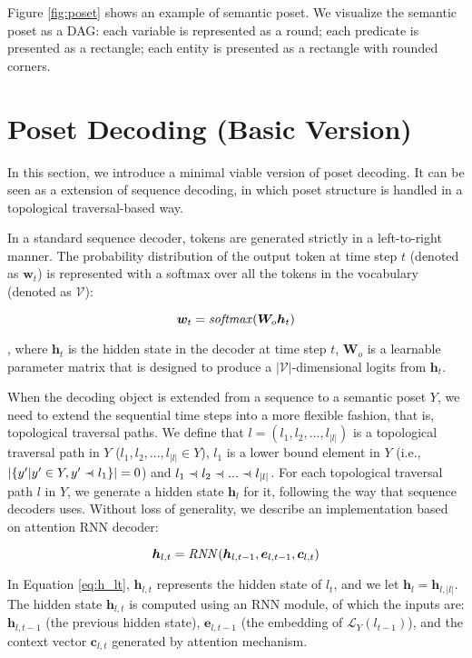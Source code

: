 \documentclass{article}
\newcommand{\precdot}{\prec\mathrel{\mkern-5mu}\mathrel{\cdot}}
\begin{document}
Figure \ref{fig:poset} shows an example of semantic poset.
We visualize the semantic poset as a DAG:
each variable is represented as a round;
each predicate is presented as a rectangle;
each entity is presented as a rectangle with rounded corners.

\section{Poset Decoding (Basic Version)}
\label{section:base}

In this section, we introduce a minimal viable version of poset decoding. It can be seen as a extension of sequence decoding, in which poset structure is handled in a topological traversal-based way.

In a standard sequence decoder, tokens are generated strictly in a left-to-right manner.
The probability distribution of the output token at time step $t$ (denoted as $\bm{w}_t$) is represented with a softmax over all the tokens in the vocabulary (denoted as $\mathcal{V}$):

\begin{equation}
\bm{w}_t = \text{\emph{softmax}}(\bm{W}_o\bm{h}_t)
\end{equation}

, where $\bm{h}_t$ is the hidden state in the decoder at time step $t$, $\bm{W}_o$ is a learnable parameter matrix that is designed to produce a $|\mathcal{V}|$-dimensional logits from $\bm{h}_t$.

When the decoding object is extended from a sequence to a semantic poset $Y$, we need to extend the sequential time steps into a more flexible fashion, that is, topological traversal paths.
We define that $l = (l_1, l_2, ..., l_{|l|})$ is a topological traversal path in $Y$ ($l_1, l_2, ..., l_{|l|}\in Y$), $l_1$ is a lower bound element in $Y$ (i.e., $|\{y'|y'\in Y, y'\precdot l_1\}|=0$) and $l_1\precdot l_2\precdot ... \precdot l_{|l|}$. For each topological traversal path $l$ in $Y$, we generate a hidden state $\bm{h}_l$ for it, following the way that sequence decoders uses.
Without loss of generality, we describe an implementation based on attention RNN decoder:

\begin{equation}
\bm{h}_{l,t} = \text{\emph{RNN}}(\bm{h}_{l,t-1}, \bm{e}_{l, t-1}, \bm{c}_{l, t})
\label{eq:h_lt}
\end{equation}

In Equation \ref{eq:h_lt}, $\bm{h}_{l,t}$ represents the hidden state of $l_t$, and we let $\bm{h}_l = \bm{h}_{l,|l|}$.
The hidden state $\bm{h}_{l,t}$ is computed using an RNN module, of which the inputs are: $\bm{h}_{l,t-1}$ (the previous hidden state), $\bm{e}_{l, t-1}$ (the embedding of $\mathcal{L}_Y(l_{t-1})$), and the context vector $\bm{c}_{l, t}$ generated by attention mechanism.
\end{document}
